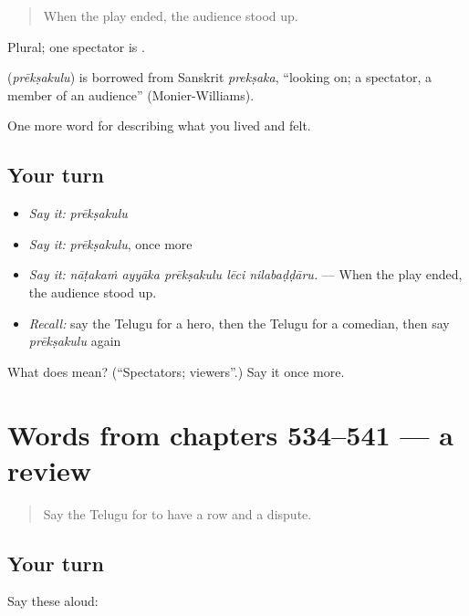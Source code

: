 \begin{quote}
When the play ended, the audience stood up.
\end{quote}

Plural; one spectator is .

\begin{cousinweb}
\textbf{} (\emph{prēkṣakulu}) is borrowed from Sanskrit \emph{prekṣaka}, \textquotedblleft{}looking on; a spectator, a member of an audience\textquotedblright{} (Monier-Williams).
\end{cousinweb}

\begin{grammarlens}[title={What you've built}]
One more word for describing what you lived and felt.
\end{grammarlens}

\subsection*{Your turn}
\begin{itemize}
\raggedright
  \item \emph{Say it:} \emph{prēkṣakulu}
  \item \emph{Say it:} \emph{prēkṣakulu}, once more
  \item \emph{Say it:} \emph{nāṭakaṁ ayyāka prēkṣakulu lēci nilabaḍḍāru.} — When the play ended, the audience stood up.
  \item \emph{Recall:} say the Telugu for a hero, then the Telugu for a comedian, then say \emph{prēkṣakulu} again
\end{itemize}

\begin{tcolorbox}[breakable,colback=teal!4,colframe=teal!35!black,title={Before you move on}]
What does  mean? (\textquotedblleft{}Spectators; viewers\textquotedblright{}.) Say it once more.
\end{tcolorbox}
\section[(dialogue)]{Words from chapters 534–541 — a review}

\label{lesson:TE-R541-review-534-541}



\begin{quote}
Say the Telugu for to have a row and a dispute.
\end{quote}

\subsection*{Your turn}
Say these aloud:

